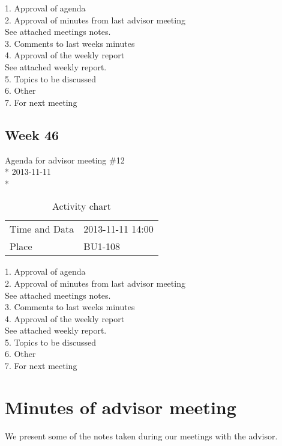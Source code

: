 1. Approval of agenda \\
2. Approval of minutes from last advisor meeting \\
See attached meetings notes. \\
3. Comments to last weeks minutes \\
4. Approval of the weekly report \\
See attached weekly report. \\
5. Topics to be discussed \\
6. Other \\
7. For next meeting \\

\newpage
\subsection{Week 46}

\begin{center}
Agenda for advisor meeting \#12\\*
2013-11-11\\*
\end{center}

\begin{table}[H]
\begin{center}
\begin{tabular}{ l | l }
Time and Data & 2013-11-11 14:00 \\
Place & BU1-108 \\
\end{tabular}
\end{center}
\caption{Activity chart}
\label{table:activityChartAdvisorAgendaWeek46}
\end{table}


1. Approval of agenda \\
2. Approval of minutes from last advisor meeting \\
See attached meetings notes. \\
3. Comments to last weeks minutes \\
4. Approval of the weekly report \\
See attached weekly report. \\
5. Topics to be discussed \\
6. Other \\
7. For next meeting \\

\fi


\section{Minutes of advisor meeting}

We present some of the notes taken during our meetings with the advisor.


